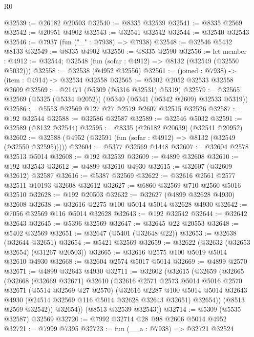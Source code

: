 \begin{lexlean}{R0}
\begin{coremodule}
@32539 := @26182 @20503
@32540 := @8335 @32539
@32541 := @8335 @2569
@32542 := @20951 @4902
@32543 := @32541 @32542
@32544 := @32540 @32543
@32546 := @7937 (fun ("_" : @7938) => @7938)
@32548 := @32546 @5432 @8133
@32549 := @8335 @4902
@32550 := @8335 @2590
@32556 := let member : @4912 := @32544;
  @32548 (fun (sofar : @4912) => @8132 (@32549 (@32550 @5032)))
@32558 := @32538 (@4952 @32556)
@32561 := (joined : @7938) -> (item : @4914) -> @32534 @32558
@32565 := @5302 @2052 @32533 @32558 @2609
@32569 := @21471 (@5309 (@5316 @32531) @5319)
@32579 := @32565 @32569 (@5325 (@5334 @2052)) (@5340 (@5341 (@5342 @2609) @32533 @5319))
@32586 := @5553 @32569 @127 @27 @2579 @2607 @32515 @32526
@32587 := @192 @32544
@32588 := @32586 @32587
@32589 := @32546 @5032
@32591 := @32589 (@8132 @32544)
@32595 := @8335 (@26182 @20639) (@32541 @20952)
@32602 := @32588 (@4952 (@32591 (fun (sofar : @4912) => @8132 (@32549 (@32550 @32595)))))
@32604 := @5377 @32569 @1448
@32607 := @32604 @2578 @32513 @5014
@32608 := @192 @32539
@32609 := @4899 @32608
@32610 := @192 @32543
@32612 := @4899 @32610 @4930
@32615 := @32607 (@32609 @32612) @32587
@32616 := @5387 @32569
@32622 := @32616 @2561 @2577 @32511 @10193 @32608 @32612
@32627 := @6860 @32569 @710 @2560 @5016 @32510
@32628 := @192 @20503
@32632 := @32627 (@4899 @32628 @4930) @32608
@32638 := @32616 @2275 @100 @5014 @5014 @32628 @4930
@32642 := @7056 @32569 @116 @5014 @32628
@32643 := @192 @32542
@32644 := @32642 @32643
@32645 := @5396 @32569
@32647 := @32645 @22 @20553
@32648 := @5402 @32569
@32651 := @32647 (@5401 (@32648 @22))
@32653 := @32638 (@32644 @32651)
@32654 := @5421 @32569
@32659 := @32622 (@32632 (@32653 @32654) (@31267 @20503))
@32665 := @32616 @2575 @100 @5019 @5014 @32610 @4930
@32668 := @32604 @2574 @5017 @5014
@32669 := @4899 @2570
@32671 := @4899 @32643 @4930
@32711 := @32602
    (@32615
      (@32659
        (@32665
          (@32668
            (@32669 @32671)
            @32610
            (@32616
              @2571
              @2573
              @5014
              @5016
              @2570
              @32671
              (@5514 @32569 @27 @2570)
              (@32616
                @2287
                @100
                @5014
                @5014
                @32643
                @4930
                (@24514 @32569 @116 @5014 @32628 @32643 @32651)
                @32654))
            (@8513 @2569 @32542))
          @32654))
      (@8513 @32539 @32543))
@32714 := @5309 (@5535 @32587) @32569
@32720 := @7992 @32714 @28 @98 @2606 @5014 @4952
@32721 := @7999 @7395
@32723 := fun (__a : @7938) => @32721 @32524

\end{coremodule}
\end{lexlean}
